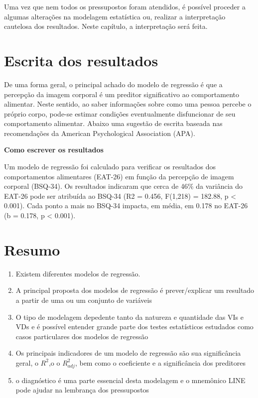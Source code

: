 \documentclass[
]{book}
\providecommand{\tightlist}{%
  \setlength{\itemsep}{0pt}\setlength{\parskip}{0pt}}
\begin{document}
Uma vez que nem todos os pressupostos foram atendidos, é possível
proceder a algumas alterações na modelagem estatística ou, realizar a
interpretação cautelosa dos resultados. Neste capítulo, a interpretação
será feita.

\hypertarget{escrita-dos-resultados-12}{%
\section{Escrita dos resultados}\label{escrita-dos-resultados-12}}

De uma forma geral, o principal achado do modelo de regressão é que a
percepção da imagem corporal é um preditor significativo ao
comportamento alimentar. Neste sentido, ao saber informações sobre como
uma pessoa percebe o próprio corpo, pode-se estimar condições
eventualmente disfuncionar de seu comportamento alimentar. Abaixo uma
sugestão de escrita baseada nas recomendações da American Psychological
Association (APA).

\begin{writing}
\textbf{Como escrever os resultados}

Um modelo de regressão foi calculado para verificar os resultados dos
comportamentos alimentares (EAT-26) em função da percepção de imagem
corporal (BSQ-34). Os resultados indicaram que cerca de 46\% da
variância do EAT-26 pode ser atribuída ao BSQ-34 (R2 = 0.456, F(1,218) =
182.88, p \textless{} 0.001). Cada ponto a mais no BSQ-34 impacta, em
média, em 0.178 no EAT-26 (b = 0.178, p \textless{} 0.001).
\end{writing}

\hypertarget{resumo-12}{%
\section{Resumo}\label{resumo-12}}

\begin{explore}

\begin{enumerate}
\def\labelenumi{\arabic{enumi}.}
\tightlist
\item
  Existem diferentes modelos de regressão.
\item
  A principal proposta dos modelos de regressão é prever/explicar um
  resultado a partir de uma ou um conjunto de variáveis\\
\item
  O tipo de modelagem depedente tanto da natureza e quantidade das VIs e
  VDs e é possível entender grande parte dos testes estatísticos
  estudados como casos particulares dos modelos de regressão\\
\item
  Os principais indicadores de um modelo de regressão são sua
  significância geral, o \(R^2\),o o \(R^2_{adj}\), bem como o
  coeficiente e a significância dos preditores\\
\item
  o diagnóstico é uma parte essencial desta modelagem e o mnemônico LINE
  pode ajudar na lembrança dos pressupostos\\
\end{enumerate}

\end{explore}
\end{document}
